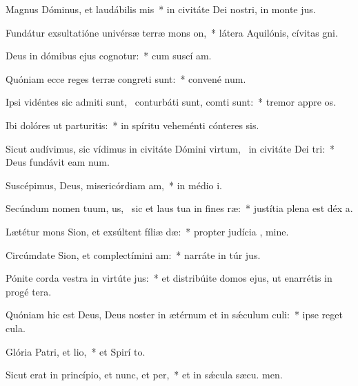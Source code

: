 \item Magnus Dóminus, et laudábilis mis~* in civitáte Dei nostri, in monte  jus.
\item Fundátur exsultatióne univérsæ terræ mons on,~* látera Aquilónis, cívitas  gni.
\item Deus in dómibus ejus cognotur:~* cum suscí am.
\item Quóniam ecce reges terræ congreti sunt:~* convené  num.
\item Ipsi vidéntes sic admiti sunt,~\pscross{} conturbáti sunt, comti sunt:~* tremor appre os.
\item Ibi dolóres ut parturitis:~* in spíritu veheménti cónteres  sis.
\item Sicut audívimus, sic vídimus in civitáte Dómini virtum,~\pscross{} in civitáte Dei tri:~* Deus fundávit eam  num.
\item Suscépimus, Deus, misericórdiam am,~* in médio  i.
\item Secúndum nomen tuum, us,~\pscross{} sic et laus tua in fines ræ:~* justítia plena est déx a.
\item Lætétur mons Sion, et exsúltent fíliæ dæ:~* propter judícia , mine.
\item Circúmdate Sion, et complectímini am:~* narráte in túr jus.
\item Pónite corda vestra in virtúte jus:~* et distribúite domos ejus, ut enarrétis in progé tera.
\item Quóniam hic est Deus, Deus noster in ætérnum et in sǽculum culi:~* ipse reget   cula.
\item Glória Patri, et lio,~* et Spirí to.
\item Sicut erat in princípio, et nunc, et per,~* et in sǽcula sæcu. men.
